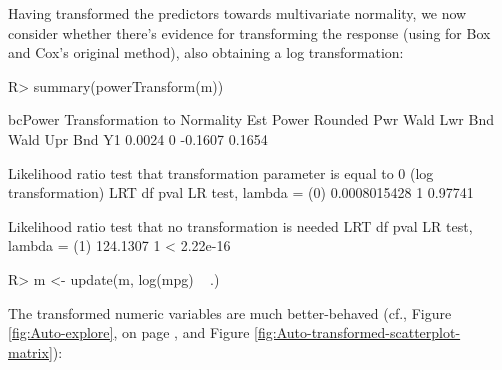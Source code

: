 \documentclass[
]{jss}
\begin{document}
Having transformed the predictors towards multivariate normality, we now
consider whether there's evidence for transforming the response (using
 for Box and Cox's original method), also
obtaining a log transformation:

\begin{CodeChunk}
\begin{CodeInput}
R> summary(powerTransform(m))
\end{CodeInput}
\begin{CodeOutput}
bcPower Transformation to Normality 
   Est Power Rounded Pwr Wald Lwr Bnd Wald Upr Bnd
Y1    0.0024           0      -0.1607       0.1654

Likelihood ratio test that transformation parameter is equal to 0
 (log transformation)
                               LRT df    pval
LR test, lambda = (0) 0.0008015428  1 0.97741

Likelihood ratio test that no transformation is needed
                           LRT df       pval
LR test, lambda = (1) 124.1307  1 < 2.22e-16
\end{CodeOutput}
\begin{CodeInput}
R> m <- update(m, log(mpg) ~ .)
\end{CodeInput}
\end{CodeChunk}

The transformed numeric variables are much better-behaved (cf., Figure
\ref{fig:Auto-explore}, on page \pageref{fig:Auto-explore}, and Figure
\ref{fig:Auto-transformed-scatterplot-matrix}):
\end{document}
